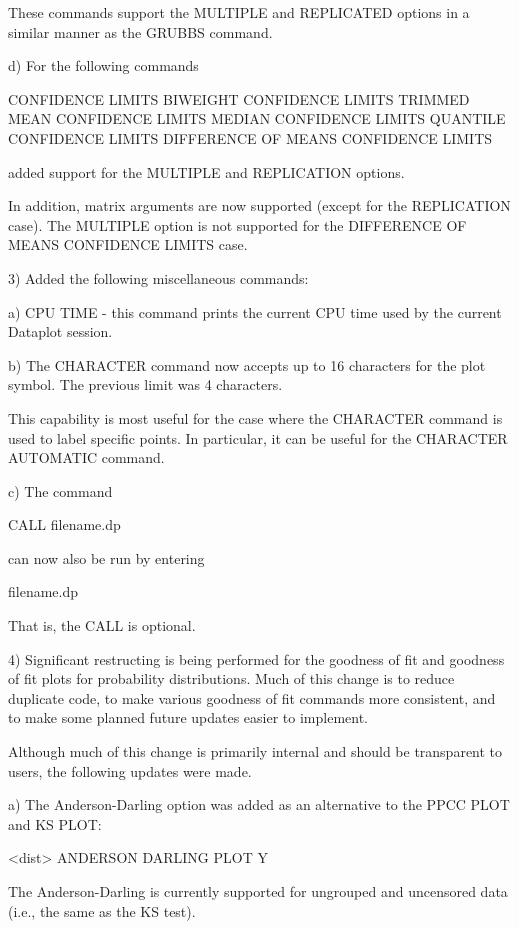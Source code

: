 {       These commands support the MULTIPLE and REPLICATED options
       in a similar manner as the GRUBBS command.

    d) For the following commands

           CONFIDENCE LIMITS
           BIWEIGHT CONFIDENCE LIMITS
           TRIMMED MEAN CONFIDENCE LIMITS
           MEDIAN CONFIDENCE LIMITS
           QUANTILE CONFIDENCE LIMITS
           DIFFERENCE OF MEANS CONFIDENCE LIMITS

       added support for the MULTIPLE and REPLICATION options.

       In addition, matrix arguments are now supported (except for
       the REPLICATION case).  The MULTIPLE option is not supported
       for the DIFFERENCE OF MEANS CONFIDENCE LIMITS case.

 3) Added the following miscellaneous commands:

    a) CPU TIME - this command prints the current CPU time
       used by the current Dataplot session.

    b) The CHARACTER command now accepts up to 16 characters for
       the plot symbol.  The previous limit was 4 characters.

       This capability is most useful for the case where the
       CHARACTER command is used to label specific points.  In
       particular, it can be useful for the CHARACTER AUTOMATIC
       command.

    c) The command

           CALL filename.dp

       can now also be run by entering

           filename.dp

       That is, the CALL is optional.

 4) Significant restructing is being performed for the
    goodness of fit and goodness of fit plots for probability
    distributions.  Much of this change is to reduce duplicate code,
    to make various goodness of fit commands more consistent,
    and to make some planned future updates easier to implement.

    Although much of this change is primarily internal and should
    be transparent to users, the following updates were made.

    a) The Anderson-Darling option was added as an alternative
       to the PPCC PLOT and KS PLOT:

           <dist> ANDERSON DARLING PLOT Y

       The Anderson-Darling is currently supported for ungrouped
       and uncensored data (i.e., the same as the KS test).

}
